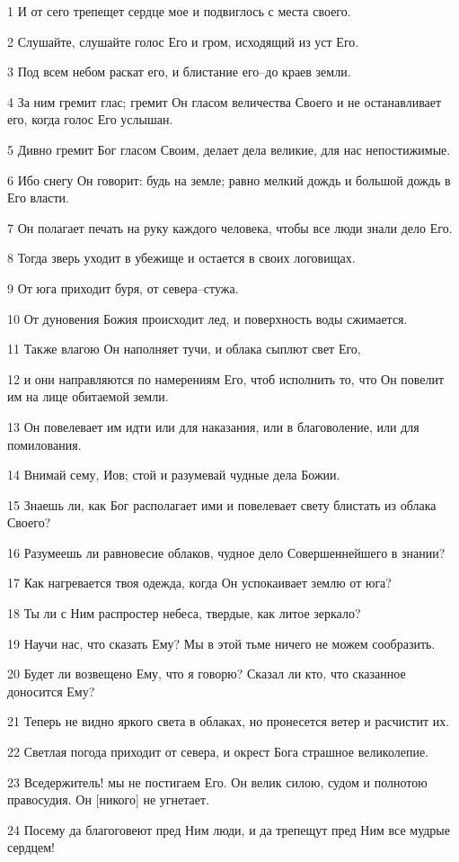 \par 1 И от сего трепещет сердце мое и подвиглось с места своего.
\par 2 Слушайте, слушайте голос Его и гром, исходящий из уст Его.
\par 3 Под всем небом раскат его, и блистание его--до краев земли.
\par 4 За ним гремит глас; гремит Он гласом величества Своего и не останавливает его, когда голос Его услышан.
\par 5 Дивно гремит Бог гласом Своим, делает дела великие, для нас непостижимые.
\par 6 Ибо снегу Он говорит: будь на земле; равно мелкий дождь и большой дождь в Его власти.
\par 7 Он полагает печать на руку каждого человека, чтобы все люди знали дело Его.
\par 8 Тогда зверь уходит в убежище и остается в своих логовищах.
\par 9 От юга приходит буря, от севера--стужа.
\par 10 От дуновения Божия происходит лед, и поверхность воды сжимается.
\par 11 Также влагою Он наполняет тучи, и облака сыплют свет Его,
\par 12 и они направляются по намерениям Его, чтоб исполнить то, что Он повелит им на лице обитаемой земли.
\par 13 Он повелевает им идти или для наказания, или в благоволение, или для помилования.
\par 14 Внимай сему, Иов; стой и разумевай чудные дела Божии.
\par 15 Знаешь ли, как Бог располагает ими и повелевает свету блистать из облака Своего?
\par 16 Разумеешь ли равновесие облаков, чудное дело Совершеннейшего в знании?
\par 17 Как нагревается твоя одежда, когда Он успокаивает землю от юга?
\par 18 Ты ли с Ним распростер небеса, твердые, как литое зеркало?
\par 19 Научи нас, что сказать Ему? Мы в этой тьме ничего не можем сообразить.
\par 20 Будет ли возвещено Ему, что я говорю? Сказал ли кто, что сказанное доносится Ему?
\par 21 Теперь не видно яркого света в облаках, но пронесется ветер и расчистит их.
\par 22 Светлая погода приходит от севера, и окрест Бога страшное великолепие.
\par 23 Вседержитель! мы не постигаем Его. Он велик силою, судом и полнотою правосудия. Он [никого] не угнетает.
\par 24 Посему да благоговеют пред Ним люди, и да трепещут пред Ним все мудрые сердцем!

